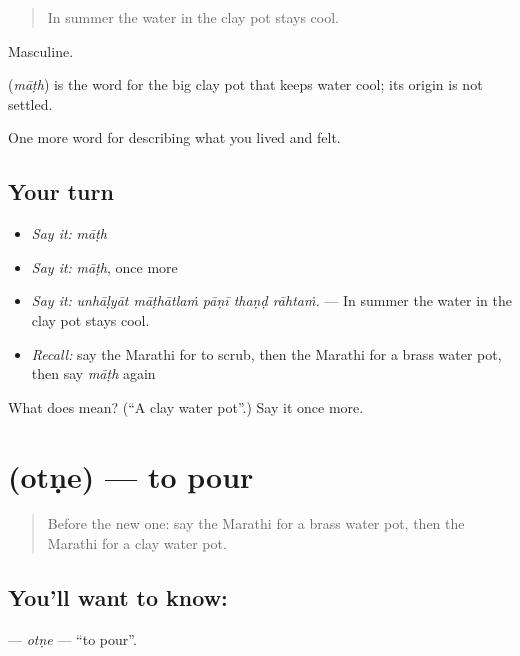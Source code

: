 \begin{quote}
In summer the water in the clay pot stays cool.
\end{quote}

Masculine.

\begin{cousinweb}
\textbf{} (\emph{māṭh}) is the word for the big clay pot that keeps water cool; its origin is not settled.
\end{cousinweb}

\begin{grammarlens}[title={What you've built}]
One more word for describing what you lived and felt.
\end{grammarlens}

\subsection*{Your turn}
\begin{itemize}
\raggedright
  \item \emph{Say it:} \emph{māṭh}
  \item \emph{Say it:} \emph{māṭh}, once more
  \item \emph{Say it:} \emph{unhāḷyāt māṭhātlaṁ pāṇī thaṇḍ rāhtaṁ.} — In summer the water in the clay pot stays cool.
  \item \emph{Recall:} say the Marathi for to scrub, then the Marathi for a brass water pot, then say \emph{māṭh} again
\end{itemize}

\begin{tcolorbox}[breakable,colback=teal!4,colframe=teal!35!black,title={Before you move on}]
What does  mean? (\textquotedblleft{}A clay water pot\textquotedblright{}.) Say it once more.
\end{tcolorbox}
\section[\texorpdfstring{\mr{ओतणे} (otṇe)}{ओतणे (otṇe)}]{ (otṇe) — to pour}

\label{lesson:MR-C525-otne}



\begin{quote}
Before the new one: say the Marathi for a brass water pot, then the Marathi for a clay water pot.
\end{quote}

\subsection*{You'll want to know: }
\textbf{} — \emph{otṇe} — \textquotedblleft{}to pour\textquotedblright{}.


